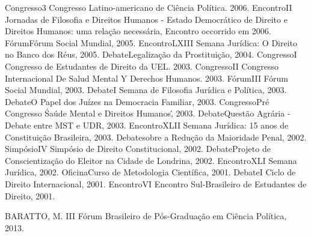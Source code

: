 

\begin{cvcitems}
  \cvcitem
    {Congresso}{3 Congresso Latino-americano de Ciência Política. 2006.}
  \cvcitem
    {Encontro}{II Jornadas de Filosofia e Direitos Humanos - Estado Democrático de Direito e Direitos Humanos: uma relação necessária, Encontro occorrido em 2006.}
  \cvcitem
    {Fórum}{Fórum Social Mundial, 2005.}
  \cvcitem
    {Encontro}{LXIII Semana Jurídica: O Direito no Banco dos Réus, 2005.}
  \cvcitem
    {Debate}{Legalização da Prostituição, 2004.}
  \cvcitem
    {Congresso}{I Congresso de Estudantes de Direito da UEL. 2003.}
  \cvcitem
    {Congresso}{II Congresso Internacional De Salud Mental Y Derechos Humanos. 2003.}
  \cvcitem
    {Fórum}{III Fórum Social Mundial, 2003.}
  \cvcitem
    {Debate}{I Semana de Filosofia Jurídica e Política, 2003.}
  \cvcitem
    {Debate}{O Papel dos Juízes na Democracia Familiar, 2003.}
  \cvcitem
    {Congresso}{Pré Congresso \'Saúde Mental e Direitos Humanos\', 2003.}
  \cvcitem
    {Debate}{Questão Agrária - Debate entre MST e UDR, 2003.}
  \cvcitem
    {Encontro}{XLII Semana Jurídica: 15 anos de Constituição Brasileira, 2003.}
  \cvcitem
    {Debate}{sobre a Redução da Maioridade Penal, 2002.}
  \cvcitem
    {Simpósio}{IV Simpósio de Direito Constitucional, 2002.}
  \cvcitem
    {Debate}{Projeto de Conscientização do Eleitor na Cidade de Londrina, 2002.}
  \cvcitem
    {Encontro}{XLI Semana Jurídica, 2002.}
  \cvcitem
    {Oficina}{Curso de Metodologia Científica, 2001.}
  \cvcitem
    {Debate}{I Ciclo de Direito Internacional, 2001.}
  \cvcitem
    {Encontro}{VI Encontro Sul-Brasileiro de Estudantes de Direito, 2001.}
\end{cvcitems}


\begin{cvcitems}
  \cvcitem
    {BARATTO, M.}
    {III Fórum Brasileiro de Pós-Graduação em Ciência Política, 2013.}
\end{cvcitems}

